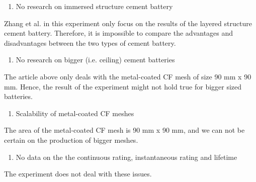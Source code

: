 \begin{enumerate}
    \item No research on immersed structure cement battery 
\end{enumerate}
Zhang et al. in this experiment only focus on the results of the layered structure cement battery. Therefore, it is impossible to compare the advantages and disadvantages between the two types of cement battery.
\begin{enumerate}[resume*]
    \item No research on bigger (i.e. ceiling) cement batteries 
\end{enumerate}
    The article above only deals with the metal-coated CF mesh of size 90 mm x 90 mm. Hence, the result of the experiment might not hold true for bigger sized batteries.
\begin{enumerate}[resume*]
    \item Scalability of metal-coated CF meshes 
\end{enumerate}
    The area of the metal-coated CF mesh is 90 mm x 90 mm, and we can not be certain on the production of bigger meshes.
\begin{enumerate}[resume*]
    \item No data on the the continuous rating, instantaneous rating and lifetime 
\end{enumerate}
    The experiment does not deal with these issues.
